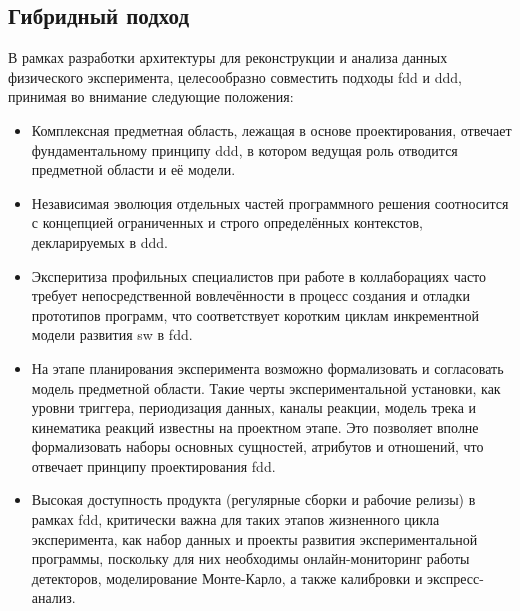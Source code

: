 \subsection{Гибридный подход}

В рамках разработки архитектуры для реконструкции и анализа данных
физического эксперимента, целесообразно совместить подходы \acrshort{fdd} и \acrshort{ddd},
принимая во внимание следующие положения:

\begin{itemize}
    \item Комплексная предметная область, лежащая в основе
    проектирования, отвечает фундаментальному принципу
    \acrshort{ddd}, в котором ведущая роль отводится предметной области и её
    модели.
    \item Независимая эволюция отдельных частей программного
    решения соотносится с концепцией ограниченных и строго
    определённых контекстов, декларируемых в \acrshort{ddd}.
    \item Эксперитиза профильных специалистов при работе в
    коллаборациях часто требует непосредственной вовлечённости
    в процесс создания и отладки прототипов программ, что
    соответствует коротким циклам инкрементной модели
    развития \acrshort{sw} в \acrshort{fdd}.
    \item На этапе планирования эксперимента возможно формализовать
    и согласовать модель предметной области. Такие черты
    экспериментальной установки, как уровни триггера, периодизация данных,
    каналы реакции, модель трека и кинематика реакций известны
    на проектном этапе. Это позволяет вполне формализовать наборы
    основных сущностей, атрибутов и отношений, что отвечает принципу
    проектирования \acrshort{fdd}.
    \item Высокая доступность продукта (регулярные сборки и
    рабочие релизы) в рамках \acrshort{fdd},
    критически важна для таких этапов жизненного цикла эксперимента,
    как набор данных и проекты развития экспериментальной программы,
    поскольку для них необходимы онлайн-мониторинг работы
    детекторов, моделирование Монте-Карло, а также калибровки
    и экспресс-анализ.
\end{itemize}

